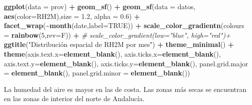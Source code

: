 \documentclass[12pt,a4paper,]{book}
\newenvironment{Shaded}{\begin{snugshade}}{\end{snugshade}}
\newcommand{\AttributeTok}[1]{\textcolor[rgb]{0.13,0.29,0.53}{#1}}
\newcommand{\CommentTok}[1]{\textcolor[rgb]{0.56,0.35,0.01}{\textit{#1}}}
\newcommand{\ConstantTok}[1]{\textcolor[rgb]{0.56,0.35,0.01}{#1}}
\newcommand{\DecValTok}[1]{\textcolor[rgb]{0.00,0.00,0.81}{#1}}
\newcommand{\FloatTok}[1]{\textcolor[rgb]{0.00,0.00,0.81}{#1}}
\newcommand{\FunctionTok}[1]{\textcolor[rgb]{0.13,0.29,0.53}{\textbf{#1}}}
\newcommand{\NormalTok}[1]{#1}
\newcommand{\SpecialCharTok}[1]{\textcolor[rgb]{0.81,0.36,0.00}{\textbf{#1}}}
\newcommand{\StringTok}[1]{\textcolor[rgb]{0.31,0.60,0.02}{#1}}
\numberwithin{dummy}{section}
\theoremstyle{ocrenumbox}
\theoremstyle{blacknumex}
\theoremstyle{blacknumbox}
\theoremstyle{ocrenum}
\theoremstyle{ocrenum}
\begin{document}
\begin{Shaded}
\begin{Highlighting}[]
\FunctionTok{ggplot}\NormalTok{(}\AttributeTok{data =}\NormalTok{ prov) }\SpecialCharTok{+} 
  \FunctionTok{geom\_sf}\NormalTok{() }\SpecialCharTok{+}
  \FunctionTok{geom\_sf}\NormalTok{(}\AttributeTok{data =}\NormalTok{ datos, }\FunctionTok{aes}\NormalTok{(}\AttributeTok{color=}\NormalTok{RH2M),}\AttributeTok{size =} \FloatTok{1.2}\NormalTok{, }\AttributeTok{alpha =} \FloatTok{0.6}\NormalTok{) }\SpecialCharTok{+}
  \FunctionTok{facet\_wrap}\NormalTok{(}\SpecialCharTok{\textasciitilde{}}\FunctionTok{month}\NormalTok{(date,}\AttributeTok{label=}\ConstantTok{TRUE}\NormalTok{)) }\SpecialCharTok{+} 
  \FunctionTok{scale\_color\_gradientn}\NormalTok{(}\AttributeTok{colours =} \FunctionTok{rainbow}\NormalTok{(}\DecValTok{5}\NormalTok{,}\AttributeTok{rev=}\NormalTok{F)) }\SpecialCharTok{+}
  \CommentTok{\# scale\_color\_gradient(low="blue", high="red")+}
  \FunctionTok{ggtitle}\NormalTok{(}\StringTok{"Distribución espacial de RH2M por mes"}\NormalTok{) }\SpecialCharTok{+}
  \FunctionTok{theme\_minimal}\NormalTok{() }\SpecialCharTok{+}
  \FunctionTok{theme}\NormalTok{(}\AttributeTok{axis.text.x=}\FunctionTok{element\_blank}\NormalTok{(),}
        \AttributeTok{axis.ticks.x=}\FunctionTok{element\_blank}\NormalTok{(),}
        \AttributeTok{axis.text.y=}\FunctionTok{element\_blank}\NormalTok{(),}
        \AttributeTok{axis.ticks.y=}\FunctionTok{element\_blank}\NormalTok{(),}
        \AttributeTok{panel.grid.major =} \FunctionTok{element\_blank}\NormalTok{(),}
        \AttributeTok{panel.grid.minor =} \FunctionTok{element\_blank}\NormalTok{())}
\end{Highlighting}
\end{Shaded}

La humedad del aire es mayor en las de costa. Las zonas más secas se
encuentran en las zonas de interior del norte de Andalucía.
\end{document}
